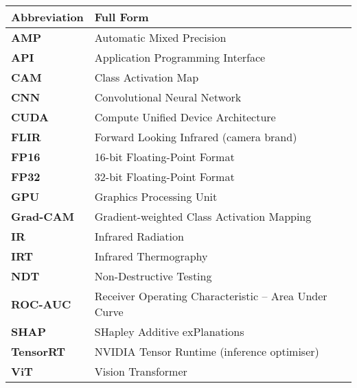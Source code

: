 \begin{table}[H]
    \renewcommand{\arraystretch}{1.5}
    \centering
    \begin{tabularx}{\textwidth}{|X|X|}
        \hline
        \textbf{Abbreviation} & \textbf{Full Form} \\\hline
        \textbf{AMP}          & Automatic Mixed Precision \\\hline
        \textbf{API}          & Application Programming Interface \\\hline
        \textbf{CAM}          & Class Activation Map \\\hline
        \textbf{CNN}          & Convolutional Neural Network \\\hline
        \textbf{CUDA}         & Compute Unified Device Architecture \\\hline
        \textbf{FLIR}         & Forward Looking Infrared (camera brand) \\\hline
        \textbf{FP16}         & 16-bit Floating-Point Format \\\hline
        \textbf{FP32}         & 32-bit Floating-Point Format \\\hline
        \textbf{GPU}          & Graphics Processing Unit \\\hline
        \textbf{Grad-CAM}     & Gradient-weighted Class Activation Mapping \\\hline
        \textbf{IR}           & Infrared Radiation \\\hline
        \textbf{IRT}          & Infrared Thermography \\\hline
        \textbf{NDT}          & Non-Destructive Testing \\\hline
        \textbf{ROC-AUC}      & Receiver Operating Characteristic – Area Under Curve \\\hline
        \textbf{SHAP}         & SHapley Additive exPlanations \\\hline
        \textbf{TensorRT}     & NVIDIA Tensor Runtime (inference optimiser) \\\hline
        \textbf{ViT}          & Vision Transformer \\\hline
    \end{tabularx}
\end{table}
